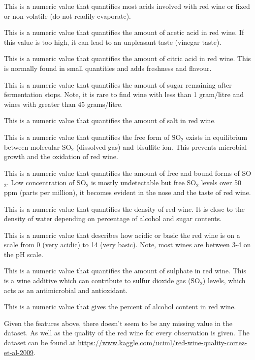 \documentclass[13pt,a4paper,titlepage]{article}
\begin{document}
	\begin{description}[font=$\bullet$~\normalfont\scshape]
		\item [Fixed Acidity] This is a numeric value that quantifies most acids involved with red wine or fixed or non-volatile (do not readily evaporate). 
		\item [Volatile Acidity] This is a numeric value that quantifies the amount of acetic acid in red wine. If this value is too high, it can lead to an unpleasant taste (vinegar taste).
		\item [Citric Acid] This is a numeric value that quantifies the amount of citric acid in red wine. This is normally found in small quantities and adds freshness and flavour.
		\item [Residual Sugar] This is a numeric value that quantifies the amount of sugar remaining after fermentation stops. Note, it is rare to find wine with less than 1 gram/litre and wines with greater than 45 grams/litre.
		\item [Chlorides] This is a numeric value that quantifies the amount of salt in red wine.
		\item [Free sulfur dioxide] This is a numeric value that quantifies the free form of SO$_2$ exists in equilibrium between molecular SO$_2$ (dissolved gas) and bisulfite ion. This prevents microbial growth and the oxidation of red wine. 
		\item [Total sulfur dioxide (PPM)] This is a numeric value that quantifies the amount of free and bound forms of SO$_2$. Low concentration of SO$_2$ is mostly undetectable but free SO$_2$ levels over 50 ppm (parts per million), it becomes evident in the nose and the taste of red wine. 
		\item [Density] This is a numeric value that quantifies the density of red wine. It is close to the density of water depending on percentage of alcohol and sugar contents. 
		\item [pH] This is a numeric value that describes how acidic or basic the red wine is on a scale from 0 (very acidic) to 14 (very basic). Note, most wines are between 3-4 on the pH scale.
		\item [Sulphates] This is a numeric value that quantifies the amount of sulphate in red wine. This is a wine additive which can contribute to sulfur dioxide gas (SO$_2$) levels, which acts as an antimicrobial and antioxidant. 
		\item [Alcohol (\%)] This is a numeric value that gives the percent of alcohol content in red wine. 
	\end{description}
	Given the features above, there doesn't seem to be any missing value in the dataset. As well as the quality of the red wine for every observation is given. The dataset can be found at \url{https://www.kaggle.com/uciml/red-wine-quality-cortez-et-al-2009}.
	
\end{document}
